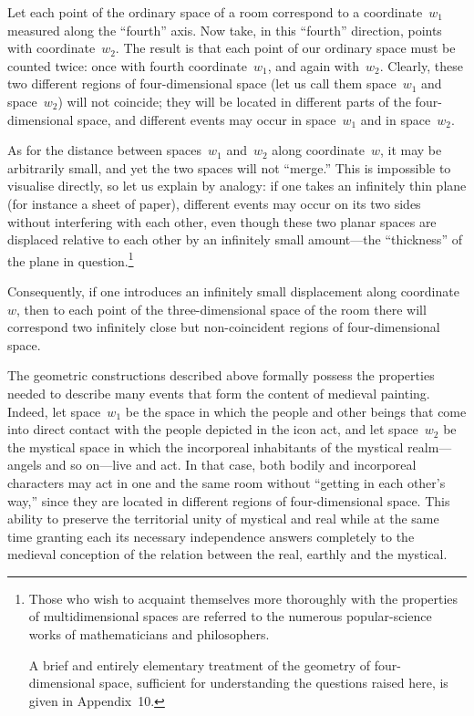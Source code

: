 Let each point of the ordinary space of a room correspond to a coordinate~$w_1$ measured
along the ``fourth'' axis.  Now take, in this ``fourth'' direction, points with
coordinate~$w_2$.  The result is that each point of our ordinary space must be counted
twice: once with fourth coordinate~$w_1$, and again with~$w_2$.  Clearly, these two
different regions of four-dimensional space (let us call them space~$w_1$ and
space~$w_2$) will not coincide; they will be located in different parts of the
four-dimensional space, and different events may occur in space~$w_1$ and in
space~$w_2$.



As for the distance between spaces~$w_1$ and~$w_2$ along coordinate~$w$, it may be
arbitrarily small, and yet the two spaces will not ``merge.''  This is impossible to
visualise directly, so let us explain by analogy: if one takes an infinitely thin plane
(for instance a sheet of paper), different events may occur on its two sides without
interfering with each other, even though these two planar spaces are displaced relative
to each other by an infinitely small amount---the ``thickness'' of the plane in
question.\footnote{Those who wish to acquaint themselves more thoroughly with the
  properties of multidimensional spaces are referred to the numerous popular-science works
  of mathematicians and philosophers.

  A brief and entirely elementary treatment of the geometry of four-dimensional space,
  sufficient for understanding the questions raised here, is given in Appendix~10.}

Consequently, if one introduces an infinitely small displacement along coordinate~$w$,
then to each point of the three-dimensional space of the room there will correspond two
infinitely close but non-coincident regions of four-dimensional space.

The geometric constructions described above formally possess the properties needed to
describe many events that form the content of medieval painting.  Indeed, let space~$w_1$
be the space in which the people and other beings that come into direct contact with the
people depicted in the icon act, and let space~$w_2$ be the mystical space in which the
incorporeal inhabitants of the mystical realm---angels and so on---live and act.  In that
case, both bodily and incorporeal characters may act in one and the same room without
``getting in each other's way,'' since they are located in different regions of
four-dimensional space.  This ability to preserve the territorial unity of mystical and
real while at the same time granting each its necessary independence answers completely
to the medieval conception of the relation between the real, earthly and the mystical.

